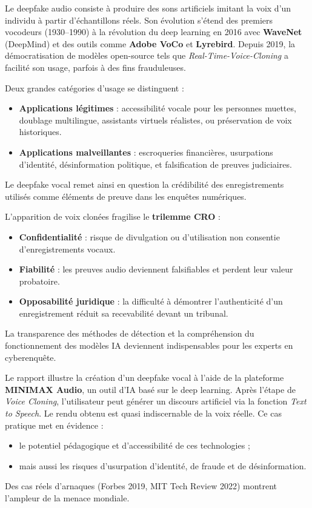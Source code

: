 \documentclass[12pt, a4em]{article}
\begin{document}
	Le deepfake audio consiste à produire des sons artificiels imitant la voix d’un individu à partir d’échantillons réels. 
	Son évolution s’étend des premiers vocodeurs (1930–1990) à la révolution du deep learning en 2016 avec \textbf{WaveNet} (DeepMind) et des outils comme \textbf{Adobe VoCo} et \textbf{Lyrebird}.
	Depuis 2019, la démocratisation de modèles open-source tels que \textit{Real-Time-Voice-Cloning} a facilité son usage, parfois à des fins frauduleuses.
	
	Deux grandes catégories d’usage se distinguent :
	\begin{itemize}
		\item \textbf{Applications légitimes} : accessibilité vocale pour les personnes muettes, doublage multilingue, assistants virtuels réalistes, ou préservation de voix historiques.
		\item \textbf{Applications malveillantes} : escroqueries financières, usurpations d’identité, désinformation politique, et falsification de preuves judiciaires.
	\end{itemize}
	Le deepfake vocal remet ainsi en question la crédibilité des enregistrements utilisés comme éléments de preuve dans les enquêtes numériques.
	
	L’apparition de voix clonées fragilise le \textbf{trilemme CRO} :
	\begin{itemize}
		\item \textbf{Confidentialité} : risque de divulgation ou d’utilisation non consentie d’enregistrements vocaux.
		\item \textbf{Fiabilité} : les preuves audio deviennent falsifiables et perdent leur valeur probatoire.
		\item \textbf{Opposabilité juridique} : la difficulté à démontrer l’authenticité d’un enregistrement réduit sa recevabilité devant un tribunal.
	\end{itemize}
	La transparence des méthodes de détection et la compréhension du fonctionnement des modèles IA deviennent indispensables pour les experts en cyberenquête.
	
	Le rapport illustre la création d’un deepfake vocal à l’aide de la plateforme \textbf{MINIMAX Audio}, un outil d’IA basé sur le deep learning.
	Après l’étape de \textit{Voice Cloning}, l’utilisateur peut générer un discours artificiel via la fonction \textit{Text to Speech}.
	Le rendu obtenu est quasi indiscernable de la voix réelle.
	Ce cas pratique met en évidence :
	\begin{itemize}
		\item le potentiel pédagogique et d’accessibilité de ces technologies ;
		\item mais aussi les risques d’usurpation d’identité, de fraude et de désinformation.
	\end{itemize}
	Des cas réels d’arnaques (Forbes 2019, MIT Tech Review 2022) montrent l’ampleur de la menace mondiale.
	
\end{document}
